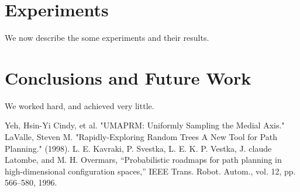 \documentclass[11pt]{article}
\begin{document}
\section{Experiments}\label{experiments}
We now describe the some experiments and their results.

\section{Conclusions and Future Work}\label{conclusions}
We worked hard, and achieved very little.


\begin{thebibliography}{1}

   Yeh, Hsin-Yi Cindy, et al. "UMAPRM: Uniformly Sampling the Medial Axis."
   LaValle, Steven M. "Rapidly-Exploring Random Trees A New Tool for Path Planning." (1998).
   L. E. Kavraki, P. Svestka, L. E. K. P. Vestka, J. claude Latombe, and M. H. Overmars, “Probabilistic roadmaps for path planning in high-dimensional configuration spaces,” IEEE Trans. Robot. Autom., vol. 12, pp. 566–580, 1996.

\end{thebibliography}
\end{document}
